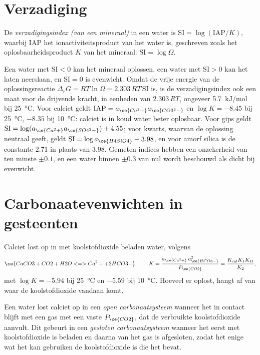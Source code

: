 \section{Verzadiging}\label{sec:b3:water-rock-interaction:saturation}

\begin{definition}[Verzadigingsindex]\label{def:b3:water-rock-interaction:si}
De \emph{verzadigingsindex (van een mineraal)}
in een water is $\mathrm{SI} = \log(\mathrm{IAP}/K)$, waarbij IAP
het ionactiviteitsproduct van het water is, geschreven zoals het oplosbaarheidsproduct
$K$ van het mineraal: $\mathrm{SI} = \log\Omega$.
\end{definition}

Een water met $\mathrm{SI} < 0$ kan het mineraal oplossen, een water met
$\mathrm{SI} > 0$ kan het laten neerslaan, en $\mathrm{SI} = 0$ is evenwicht.
Omdat de vrije energie van de oplossingsreactie $\Delta_r G = RT\ln\Omega
= 2.303\,RT\,\mathrm{SI}$ is, is de verzadigingsindex ook een maat voor de
drijvende kracht, in eenheden van $2.303\,RT$, ongeveer \qty{5.7}{kJ/mol} bij
\qty{25}{\celsius}. Voor calciet geldt $\mathrm{IAP} = a_{\ce{Ca^2+}}
a_{\ce{CO3^2-}}$ en $\log K = -8.45$ bij \qty{25}{\celsius}, $-8.35$ bij
\qty{10}{\celsius}: calciet is in koud water beter oplosbaar. Voor gips geldt $\mathrm{SI} = \log(a_{\ce{Ca^2+}}a_{\ce{SO4^2-}}) + 4.55$;
voor kwarts, waarvan de oplossing neutraal  geeft, geldt $\mathrm{SI} = \log
a_{\ce{H4SiO4}} + 3.98$, en voor amorf silica is de constante 2.71
in plaats van 3.98. Gemeten indices hebben een onzekerheid van ten minste $\pm0.1$,
en een water binnen $\pm0.3$ van nul wordt beschouwd als dicht bij evenwicht.

\section{Carbonaatevenwichten in gesteenten}\label{sec:b3:water-rock-interaction:carbonate}

Calciet lost op in met koolstofdioxide beladen water, volgens
\[
\ce{CaCO3 + CO2 + H2O <=> Ca^2+ + 2 HCO3-},
\qquad K = \frac{a_{\ce{Ca^2+}}\,a_{\ce{HCO3-}}^2}{P_{\ce{CO2}}}
= \frac{K_{\mathrm{cal}}K_1K_H}{K_2},
\]
met $\log K = -5.94$ bij \qty{25}{\celsius} en $-5.59$ bij \qty{10}{\celsius}.
Hoeveel er oplost, hangt af van waar de koolstofdioxide vandaan komt.

\begin{definition}\label{def:b3:water-rock-interaction:open-closed}
Een water lost calciet op in een \emph{open carbonaatsysteem}
wanneer het in contact blijft met een gas met een vaste
$P_{\ce{CO2}}$, dat de verbruikte koolstofdioxide aanvult. Dit gebeurt in een
\emph{gesloten carbonaatsysteem} wanneer het eerst
met koolstofdioxide is beladen en daarna van het gas is afgesloten, zodat
het enige wat het kan gebruiken de koolstofdioxide is die het bevat.
\end{definition}

